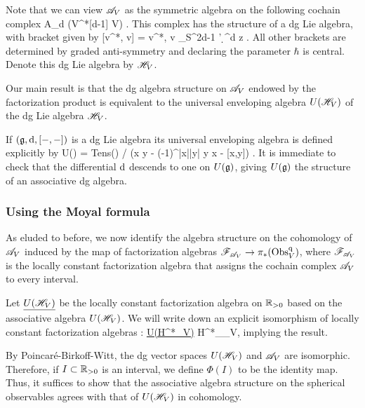 Note that we can view $\mathscr A_V$ as the symmetric algebra on the following cochain complex
\ben
A_d \tensor (V^*[d-1] \tensor V) \oplus \CC \cdot \hbar .
\een
This complex has the structure of a dg Lie algebra, with bracket given by
\be\label{HV bracket}
[\alpha \tensor v^*, \alpha \tensor v] = \hbar \<v^*, v\> \oint_{S^{2d-1}} \alpha \wedge \alpha'  \d^d z .
\ee
All other brackets are determined by graded anti-symmetry and declaring the parameter $\hbar$ is central.
Denote this dg Lie algebra by $\mathscr H_V$. 

Our main result is that the dg algebra structure on $\mathscr A_V$ endowed by the factorization product is equivalent to the universal enveloping algebra $U(\mathscr H_V)$ of the dg Lie algebra $\mathscr H_V$.

\begin{rmk}
If $(\mathfrak g, {\rm d}, [-,-])$ is a dg Lie algebra its universal enveloping algebra is defined explicitly by 
\ben
U(\fg) = {\rm Tens}(\fg) / (x \tensor y - (-1)^{|x||y|} y \tensor x - [x,y]) .
\een
It is immediate to check that the differential ${\rm d}$ descends to one on $U(\mathfrak g)$, giving $U(\mathfrak g)$ the structure of an associative dg algebra.
\end{rmk}

\subsubsection{Using the Moyal formula}

As eluded to before, we now identify the algebra structure on the cohomology of $\mathscr A_V$
induced by the map of factorization algebras $\mathscr F_{\mathscr A_V} \to \pi_*({\rm Obs}_V^{\rm q})$, where $\mathscr F_{\mathscr A_V}$ is the locally constant factorization algebra that assigns the cochain complex $\mathscr A_V$ to every interval.

Let $\underline{U(\mathscr H_V)}$ be the locally constant factorization algebra on $\mathbb R_{>0}$ based on the associative algebra $U(\mathscr H_V)$. 
We will write down an explicit isomorphism of locally constant factorization algebras
\ben
\Phi : \ul{U(H^*\sH_V)} \to H^*\sF_{\sA_V},
\een
implying the result. 

By Poincar\'{e}-Birkoff-Witt, the dg vector spaces $U(\mathscr H_V)$ and $\mathscr A_V$ are isomorphic. 
Therefore, if $I \subset \mathbb R_{>0}$ is an interval, we define $\Phi(I)$ to be the identity map. 
Thus, it suffices to show that the associative algebra structure on the spherical observables agrees with that of $U(\mathscr H_V)$ in cohomology.


